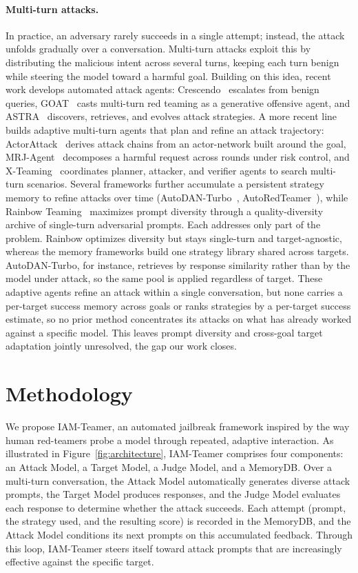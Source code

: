 \documentclass[a4paper,fleqn]{cas-sc}
\begin{document}
\paragraph{Multi-turn attacks.}
In practice, an adversary rarely succeeds in a single attempt; instead, the attack unfolds gradually over a conversation.
Multi-turn attacks exploit this by distributing the malicious intent across several turns, keeping each turn benign while steering the model toward a harmful goal.
Building on this idea, recent work develops automated attack agents: Crescendo~\cite{crescendo} escalates from benign queries, GOAT~\cite{goat} casts multi-turn red teaming as a generative offensive agent, and ASTRA~\cite{astra} discovers, retrieves, and evolves attack strategies.
A more recent line builds adaptive multi-turn agents that plan and refine an attack trajectory: ActorAttack~\cite{actorattack} derives attack chains from an actor-network built around the goal, MRJ-Agent~\cite{mrjagent} decomposes a harmful request across rounds under risk control, and X-Teaming~\cite{xteaming} coordinates planner, attacker, and verifier agents to search multi-turn scenarios.
Several frameworks further accumulate a persistent strategy memory to refine attacks over time (AutoDAN-Turbo~\cite{autodanturbo}, AutoRedTeamer~\cite{autoredteamer}), while Rainbow Teaming~\cite{rainbow} maximizes prompt diversity through a quality-diversity archive of single-turn adversarial prompts.
Each addresses only part of the problem. Rainbow optimizes diversity but stays single-turn and target-agnostic, whereas the memory frameworks build one strategy library shared across targets. AutoDAN-Turbo, for instance, retrieves by response similarity rather than by the model under attack, so the same pool is applied regardless of target.
These adaptive agents refine an attack within a single conversation, but none carries a per-target success memory across goals or ranks strategies by a per-target success estimate, so no prior method concentrates its attacks on what has already worked against a specific model. This leaves prompt diversity and cross-goal target adaptation jointly unresolved, the gap our work closes.
\section{Methodology}
\label{sec:method}

We propose IAM-Teamer, an automated jailbreak framework inspired by the way human red-teamers probe a model through repeated, adaptive interaction.
As illustrated in Figure~\ref{fig:architecture}, IAM-Teamer comprises four components: an Attack Model, a Target Model, a Judge Model, and a MemoryDB.
Over a multi-turn conversation, the Attack Model automatically generates diverse attack prompts, the Target Model produces responses, and the Judge Model evaluates each response to determine whether the attack succeeds.
Each attempt (prompt, the strategy used, and the resulting score) is recorded in the MemoryDB, and the Attack Model conditions its next prompts on this accumulated feedback.
Through this loop, IAM-Teamer steers itself toward attack prompts that are increasingly effective against the specific target.
\end{document}
